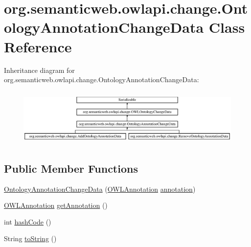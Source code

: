 \hypertarget{classorg_1_1semanticweb_1_1owlapi_1_1change_1_1_ontology_annotation_change_data}{\section{org.\-semanticweb.\-owlapi.\-change.\-Ontology\-Annotation\-Change\-Data Class Reference}
\label{classorg_1_1semanticweb_1_1owlapi_1_1change_1_1_ontology_annotation_change_data}
}
Inheritance diagram for org.\-semanticweb.\-owlapi.\-change.\-Ontology\-Annotation\-Change\-Data\-:\begin{figure}[H]
\begin{center}
\leavevmode
\includegraphics[height=2.894057cm]{classorg_1_1semanticweb_1_1owlapi_1_1change_1_1_ontology_annotation_change_data}
\end{center}
\end{figure}
\subsection*{Public Member Functions}
\begin{DoxyCompactItemize}
\item 
\hyperlink{classorg_1_1semanticweb_1_1owlapi_1_1change_1_1_ontology_annotation_change_data_a156bfd0173e03dbb2fee369c46cd3751}{Ontology\-Annotation\-Change\-Data} (\hyperlink{interfaceorg_1_1semanticweb_1_1owlapi_1_1model_1_1_o_w_l_annotation}{O\-W\-L\-Annotation} \hyperlink{classorg_1_1semanticweb_1_1owlapi_1_1change_1_1_ontology_annotation_change_data_a9adc959d9ad5bcdce1eee5141c22e3af}{annotation})
\item 
\hyperlink{interfaceorg_1_1semanticweb_1_1owlapi_1_1model_1_1_o_w_l_annotation}{O\-W\-L\-Annotation} \hyperlink{classorg_1_1semanticweb_1_1owlapi_1_1change_1_1_ontology_annotation_change_data_afc789e5e75aaefadc687c74c518dd53d}{get\-Annotation} ()
\item 
int \hyperlink{classorg_1_1semanticweb_1_1owlapi_1_1change_1_1_ontology_annotation_change_data_af22b7fe27b1c99c94f9bb33580f57850}{hash\-Code} ()
\item 
String \hyperlink{classorg_1_1semanticweb_1_1owlapi_1_1change_1_1_ontology_annotation_change_data_a3c90fb663725dbe9fc5ac5db907a4a74}{to\-String} ()
\end{DoxyCompactItemize}

